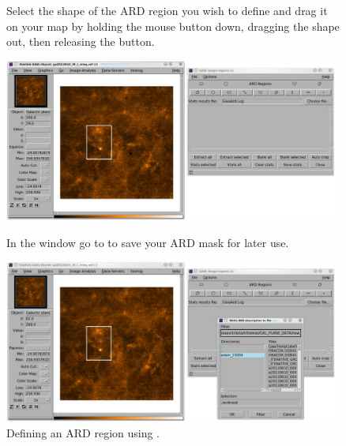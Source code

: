 \documentclass[11pt,oneside,chapters]{starlink}
\begin{document}
\begin{figure}[ht!]
\begin{center}
\begin{fmpage}{0.99\linewidth}
\hspace{0.1cm}
\begin{minipage}[c]{0.23\linewidth}
Select the shape of the ARD region you wish to define and drag it on
your map by holding the mouse button down, dragging the shape out,
then releasing the button.
\end{minipage}
\hspace{0.2cm}
\begin{minipage}[c]{0.72\linewidth}
\centering
\includegraphics[width=0.98\textwidth]{sc20_ard3}
\vspace{0.2cm}
\end{minipage}

\vspace{0.5cm}


\hspace{0.1cm}
\begin{minipage}[c]{0.23\linewidth}
In the  window go to  to save your ARD mask for later use.
\end{minipage}
\hspace{0.2cm}
\begin{minipage}[c]{0.72\linewidth}
\centering
\includegraphics[width=0.98\textwidth]{sc20_ard4}
\vspace{0.2cm}
\end{minipage}

\end{fmpage}
\end{center}
\caption[Defining an ARD region using \gaia]{\small
  Defining an ARD region using \gaia.}
\end{figure}
\end{document}
